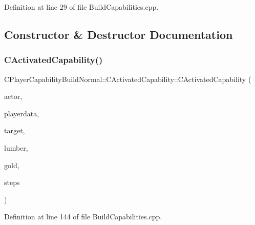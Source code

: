 Definition at line 29 of file Build\+Capabilities.\+cpp.



\subsection{Constructor \& Destructor Documentation}
\hypertarget{classCPlayerCapabilityBuildNormal_1_1CActivatedCapability_a33a64e3a38d5e2e3c705d3350780a17a}{}\label{classCPlayerCapabilityBuildNormal_1_1CActivatedCapability_a33a64e3a38d5e2e3c705d3350780a17a} 
\subsubsection{\texorpdfstring{C\+Activated\+Capability()}{CActivatedCapability()}}
{\footnotesize\ttfamily C\+Player\+Capability\+Build\+Normal\+::\+C\+Activated\+Capability\+::\+C\+Activated\+Capability (\begin{DoxyParamCaption}\item[{std\+::shared\+\_\+ptr$<$ \hyperlink{classCPlayerAsset}{C\+Player\+Asset} $>$}]{actor,  }\item[{std\+::shared\+\_\+ptr$<$ \hyperlink{classCPlayerData}{C\+Player\+Data} $>$}]{playerdata,  }\item[{std\+::shared\+\_\+ptr$<$ \hyperlink{classCPlayerAsset}{C\+Player\+Asset} $>$}]{target,  }\item[{int}]{lumber,  }\item[{int}]{gold,  }\item[{int}]{steps }\end{DoxyParamCaption})}



Definition at line 144 of file Build\+Capabilities.\+cpp.


